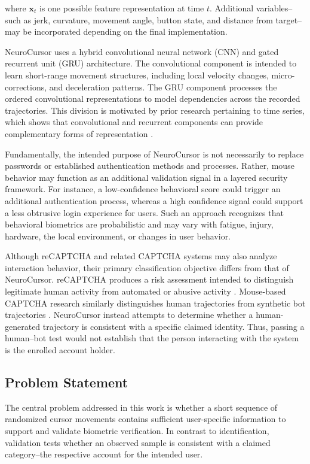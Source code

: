 \documentclass[conference]{IEEEtran}
\begin{document}
where $\mathbf{x}_t$ is one possible feature representation at time $t$. Additional variables--such as jerk, curvature, movement angle, button state, and distance from target--may be incorporated depending on the final implementation. 

NeuroCursor uses a hybrid convolutional neural network (CNN) and gated recurrent unit (GRU) architecture. The convolutional component is intended to learn short-range movement structures, including local velocity changes, micro-corrections, and deceleration patterns. The GRU component processes the ordered convolutional representations to model dependencies across the recorded trajectories. This division is motivated by prior research pertaining to time series, which shows that convolutional and recurrent components can provide complementary forms of representation \cite{foumaniTimeSeriesSurvey, elsayedGRUFCN}.

Fundamentally, the intended purpose of NeuroCursor is not necessarily to replace passwords or established authentication methods and processes. Rather, mouse behavior may function as an additional validation signal in a layered security framework. For instance, a low-confidence behavioral score could trigger an additional authentication process, whereas a high confidence signal could support a less obtrusive login experience for users. Such an approach recognizes that behavioral biometrics are probabilistic and may vary with fatigue, injury, hardware, the local environment, or changes in user behavior.

Although reCAPTCHA and related CAPTCHA systems may also analyze interaction behavior, their primary classification objective differs from that of NeuroCursor. reCAPTCHA produces a risk assessment intended to distinguish legitimate human activity from automated or abusive activity \cite{googleRecaptchaOverview,googleRecaptchaV3}. Mouse-based CAPTCHA research similarly distinguishes human trajectories from synthetic bot trajectories \cite{acien2020BeCAPTCHA}. NeuroCursor instead attempts to determine whether a human-generated trajectory is consistent with a specific claimed identity. Thus, passing a human--bot test would not establish that the person interacting with the system is the enrolled account holder.
   

\subsection{Problem Statement}

The central problem addressed in this work is whether a short sequence of randomized cursor movements contains sufficient user-specific information to support and validate biometric verification. In contrast to identification, validation tests whether an observed sample is consistent with a claimed category--the respective account for the intended user. 
\end{document}
